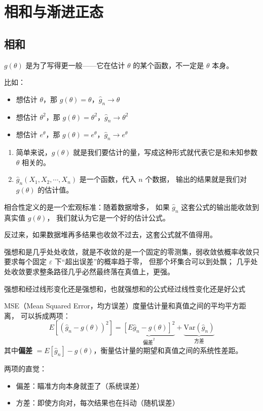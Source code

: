 \section{相和与渐进正态}
\subsection{相和}
\begin{note}
    $g(\theta)$ 是为了写得更一般——它在估计 $\theta$ 的某个函数，不一定是 $\theta$ 本身。

比如：
\begin{itemize}
    \item 想估计 $\theta$，那 $g(\theta)=\theta$，$\hat{g}_n \to \theta$
    \item 想估计 $\theta^2$，那 $g(\theta)=\theta^2$，$\hat{g}_n \to \theta^2$
    \item 想估计 $e^\theta$，那 $g(\theta)=e^\theta$，$\hat{g}_n \to e^\theta$
\end{itemize}
\end{note}
\begin{dxtips}
   \begin{enumerate}
       \item 简单来说，$g(\theta)$ 就是我们要估计的量，写成这种形式就代表它是和未知参数 $\theta$ 相关的。\item $\hat{g}_n(X_1, X_2, \cdots, X_n)$ 是一个函数，代入 $n$ 个数据，
输出的结果就是我们对 $g(\theta)$ 的估计值。
   \end{enumerate}
\end{dxtips}
\begin{note}
    相合性定义的是一个宏观标准：随着数据增多，
如果 $\hat{g}_n$ 这套公式的输出能收敛到真实值 $g(\theta)$，
我们就认为它是一个好的估计公式。

反过来，如果数据堆再多结果也收敛不过去，这套公式就不值得用。
\end{note}
\begin{dxtips}
    强想和是几乎处处收敛，就是不收敛的是一个固定的零测集，弱收敛依概率收敛只要求每个固定 $\varepsilon$ 下``超出误差''的概率趋于零，
但那个坏集合可以到处飘；
几乎处处收敛要求整条路径几乎必然最终落在真值上，更强。
\end{dxtips}
\begin{note}
    强想和经过线形变化还是强想和，也就强想和的公式经过线性变化还是好公式
\end{note}
\begin{note}
MSE（Mean Squared Error，均方误差）度量估计量和真值之间的平均平方距离，
可以拆成两项：
$$
E\!\left[(\hat{g}_n - g(\theta))^2\right]
= \underbrace{\left[E\hat{g}_n - g(\theta)\right]^2}_{\text{偏差}^2}
+ \underbrace{\mathrm{Var}(\hat{g}_n)}_{\text{方差}}
$$
其中\textbf{偏差} $= E[\hat{g}_n] - g(\theta)$，衡量估计量的期望和真值之间的系统性差距。

两项的直觉：
\begin{itemize}
    \item 偏差：瞄准方向本身就歪了（系统误差）
    \item 方差：即使方向对，每次结果也在抖动（随机误差）
\end{itemize}
\end{note}
